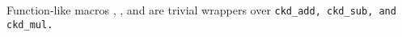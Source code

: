 Function-like macros , , and  are
trivial wrappers over \tt{ckd_add},   \tt{ckd_sub},  and  \tt{ckd_mul}.
